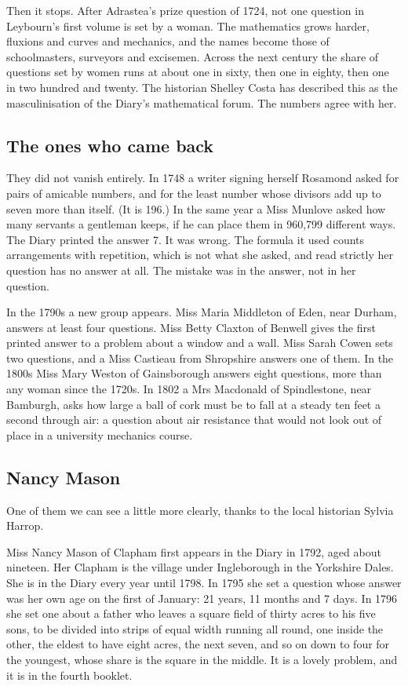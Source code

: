 \documentclass[11pt,a4paper]{article}
\begin{document}
Then it stops. After Adrastea's prize question of 1724, not one question
in Leybourn's first volume is set by a woman. The mathematics grows
harder, fluxions and curves and mechanics, and the names become those of
schoolmasters, surveyors and excisemen. Across the next century the
share of questions set by women runs at about one in sixty, then one in
eighty, then one in two hundred and twenty. The historian Shelley Costa
has described this as the masculinisation of the Diary's mathematical
forum. The numbers agree with her.

\hypertarget{the-ones-who-came-back}{%
\subsection{The ones who came back}\label{the-ones-who-came-back}}

They did not vanish entirely. In 1748 a writer signing herself Rosamond
asked for pairs of amicable numbers, and for the least number whose
divisors add up to seven more than itself. (It is 196.) In the same year
a Miss Munlove asked how many servants a gentleman keeps, if he can
place them in 960,799 different ways. The Diary printed the answer 7. It
was wrong. The formula it used counts arrangements with repetition,
which is not what she asked, and read strictly her question has no
answer at all. The mistake was in the answer, not in her question.

In the 1790s a new group appears. Miss Maria Middleton of Eden, near
Durham, answers at least four questions. Miss Betty Claxton of Benwell
gives the first printed answer to a problem about a window and a wall.
Miss Sarah Cowen sets two questions, and a Miss Castieau from Shropshire
answers one of them. In the 1800s Miss Mary Weston of Gainsborough
answers eight questions, more than any woman since the 1720s. In 1802 a
Mrs Macdonald of Spindlestone, near Bamburgh, asks how large a ball of
cork must be to fall at a steady ten feet a second through air: a
question about air resistance that would not look out of place in a
university mechanics course.

\hypertarget{nancy-mason}{%
\subsection{Nancy Mason}\label{nancy-mason}}

One of them we can see a little more clearly, thanks to the local
historian Sylvia Harrop.

Miss Nancy Mason of Clapham first appears in the Diary in 1792, aged
about nineteen. Her Clapham is the village under Ingleborough in the
Yorkshire Dales. She is in the Diary every year until 1798. In 1795 she
set a question whose answer was her own age on the first of January: 21
years, 11 months and 7 days. In 1796 she set one about a father who
leaves a square field of thirty acres to his five sons, to be divided
into strips of equal width running all round, one inside the other, the
eldest to have eight acres, the next seven, and so on down to four for
the youngest, whose share is the square in the middle. It is a lovely
problem, and it is in the fourth booklet.
\end{document}
